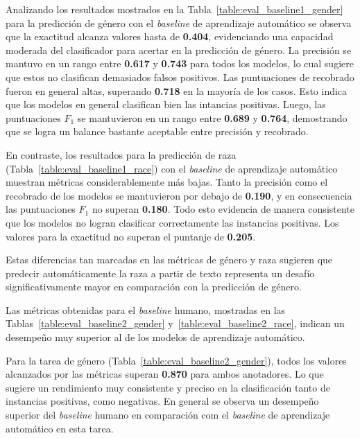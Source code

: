 Analizando los resultados mostrados en la Tabla~\ref{table:eval_baseline1_gender} para la predicci\'on de g\'enero con el 
\emph{baseline} de aprendizaje autom\'atico se observa que la exactitud alcanza valores hasta de \textbf{0.404}, 
evidenciando una capacidad moderada del clasificador para acertar en la predicci\'on de g\'enero. La precisi\'on se 
mantuvo en un rango entre \textbf{0.617} y \textbf{0.743} para todos los modelos, lo cual sugiere que estos no
clasifican demasiados falsos positivos. Las puntuaciones de recobrado fueron en general altas, superando \textbf{0.718}
en la mayor\'ia de los casos. Esto indica que los modelos en general clasifican bien las intancias positivas. Luego, las 
puntuaciones $F_1$ se mantuvieron en un rango entre \textbf{0.689} y \textbf{0.764}, demostrando que se logra
un balance bastante aceptable entre precisi\'on y recobrado.%

En contraste, los resultados para la predicci\'on de raza (Tabla~\ref{table:eval_baseline1_race}) con el 
\emph{baseline} de aprendizaje autom\'atico muestran m\'etricas considerablemente m\'as bajas. Tanto la 
precisi\'on como el recobrado de los modelos se mantuvieron por debajo de \textbf{0.190}, y en consecuencia 
las puntuaciones $F_1$ no superan \textbf{0.180}. Todo esto evidencia de manera consistente que los modelos no 
logran clasificar correctamente las instancias positivas. Los valores para la exactitud no superan el puntanje 
de \textbf{0.205}. 

Estas diferencias tan marcadas en las m\'etricas de g\'enero y raza sugieren que predecir autom\'aticamente la 
raza a partir de texto representa un desaf\'io significativamente mayor en comparaci\'on con la predicci\'on de 
g\'enero. 

Las m\'etricas obtenidas para el \emph{baseline} humano, mostradas en las 
Tablas~\ref{table:eval_baseline2_gender} y~\ref{table:eval_baseline2_race}, indican un desempe\~no muy 
superior al de los modelos de aprendizaje autom\'atico. 

Para la tarea de g\'enero (Tabla~\ref{table:eval_baseline2_gender}), todos los valores alcanzados
por las m\'etricas superan \textbf{0.870} para ambos anotadores. Lo que sugiere un 
rendimiento muy consistente y preciso en la clasificaci\'on tanto de instancias positivas, 
como negativas. En general se observa un desempe\~no superior del 
\emph{baseline} humano en comparaci\'on com el \emph{baseline} de aprendizaje autom\'atico en 
esta tarea.

